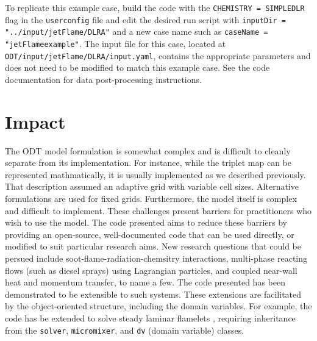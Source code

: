 \documentclass[preprint,12pt, a4paper]{elsarticle}
\begin{document}
To replicate this example case, build the code with the \texttt{CHEMISTRY = SIMPLEDLR} flag in the \texttt{user\textunderscore config} file and edit the desired run script with \texttt{inputDir = "../input/jetFlame/DLR\textunderscore A"} and a new case name such as \texttt{caseName = "jetFlame\textunderscore example"}. The input file for this case, located at \texttt{ODT/input/jetFlame/DLR\textunderscore A/input.yaml}, contains the appropriate parameters and does not need to be modified to match this example case. See the code documentation for data post-processing instructions.


\section{Impact}
\label{sec:impact}

The ODT model formulation is somewhat complex and is difficult to cleanly separate from its implementation. For instance, while the triplet map can be represented mathmatically, it is usually implemented as we described previously. That description assumed an adaptive grid with variable cell sizes. Alternative formulations are used for fixed grids. Furthermore, the model itself is complex and difficult to implement. These challenges present barriers for practitioners who wish to use the model. The code presented aims to reduce these barriers by providing an open-source, well-documented code that can be used directly, or modified to suit particular research aims. New research questions that could be persued include soot-flame-radiation-chemsitry interactions, multi-phase reacting flows (such as diesel sprays) using Lagrangian particles, and coupled near-wall heat and momentum transfer, to name a few. The code presented has been demonstrated to be extensible to such systems. These extensions are facilitated by the object-oriented structure, including the domain variables. For example, the code has be extended to solve steady laminar flamelets \cite{Peters_1984}, requiring inheritance from the \texttt{solver}, \texttt{micromixer}, and \texttt{dv} (domain variable) classes.
\end{document}

